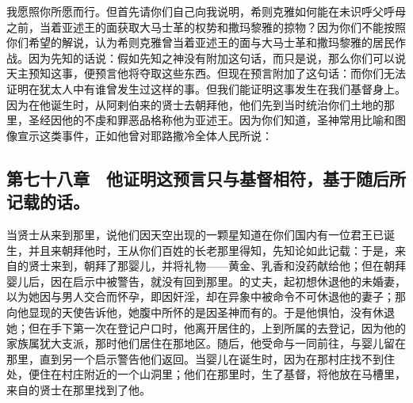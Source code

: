 我愿照你所愿而行。但首先请你们自己向我说明，希则克雅如何能在未识呼父呼母之前，当着亚述王的面获取大马士革的权势和撒玛黎雅的掠物？因为你们不能按照你们希望的解说，认为希则克雅曾当着亚述王的面与大马士革和撒玛黎雅的居民作战。因为先知的话说：假如先知之神没有附加这句话，而只是说，那么你们可以说天主预知这事，便预言他将夺取这些东西。但现在预言附加了这句话：而你们无法证明在犹太人中有谁曾发生过这样的事。但我们能证明这事发生在我们基督身上。因为在他诞生时，从阿剌伯来的贤士去朝拜他，他们先到当时统治你们土地的那里，圣经因他的不虔和罪恶品格称他为亚述王。因为你们知道，圣神常用比喻和图像宣示这类事件，正如他曾对耶路撒冷全体人民所说：\par


\subsection{第七十八章　他证明这预言只与基督相符，基于随后所记载的话。}

当贤士从来到那里，说他们因天空出现的一颗星知道在你们国内有一位君王已诞生，并且来朝拜他时，王从你们百姓的长老那里得知，先知论如此记载：于是，来自的贤士来到，朝拜了那婴儿，并将礼物——黄金、乳香和没药献给他；但在朝拜婴儿后，因在启示中被警告，就没有回到那里。的丈夫，起初想休退他的未婚妻，以为她因与男人交合而怀孕，即因奸淫，却在异象中被命令不可休退他的妻子；那向他显现的天使告诉他，她腹中所怀的是因圣神而有的。于是他惧怕，没有休退她；但在手下第一次在登记户口时，他离开居住的，上到所属的去登记，因为他的家族属犹大支派，那时他们居住在那地区。随后，他受命与一同前往，与婴儿留在那里，直到另一个启示警告他们返回。当婴儿在诞生时，因为在那村庄找不到住处，便住在村庄附近的一个山洞里；他们在那里时，生了基督，将他放在马槽里，来自的贤士在那里找到了他。\par

